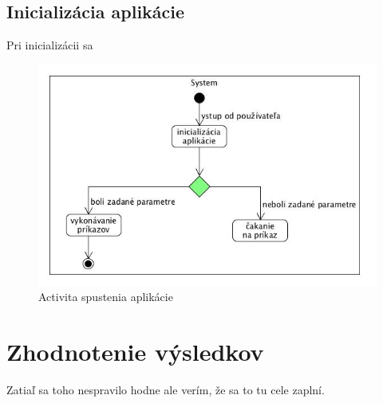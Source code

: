 \subsection{Inicializácia aplikácie}
\indent Pri inicializácii sa 
\begin{figure}[!htbp]
	\centering
	\includegraphics[width=\linewidth]{img/System.jpg}
	\caption{Activita spustenia aplikácie}
	\label{fig:test}
\end{figure}
\section{Zhodnotenie výsledkov}
Zatiaľ sa toho nespravilo hodne ale verím, že sa to tu cele zaplní.